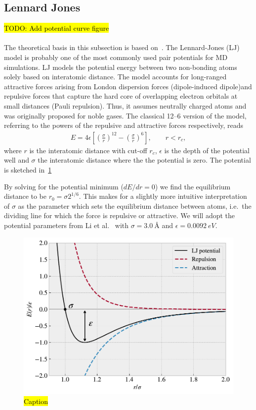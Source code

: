\subsection{Lennard Jones}\label{sec:LJ}
\hl{TODO: Add potential curve figure} 
\\
\\
The theoretical basis in this subsection is based on~\cite{docs_lammps_LJ,
C9CP05445F, chem_libretexts_LJ}. The Lennard-Jones (\acrshort{LJ}) model is probably one of the most commonly used pair potentials for \acrshort{MD} simulations. \acrshort{LJ} models the potential energy between two non-bonding atoms solely based on interatomic distance. The model accounts for long-ranged attractive forces arising from London dispersion forces (dipole-induced dipole)and repulsive forces that capture the hard core of overlapping electron orbitals at small distances (Pauli repulsion). Thus, it assumes neutrally charged atoms and was originally proposed for noble gases. The classical 12--6 version of the model, referring to the powers of the repulsive and attractive forces respectively, reads
\begin{align}
  E = 4\epsilon \left[\left(\frac{\sigma}{r}\right)^{12} - \left(\frac{\sigma}{r}\right)^6 \right ], \qquad r < r_c,
  \label{eq:LJ}
\end{align}
where $r$ is the interatomic distance with cut-off $r_c$, $\epsilon$ is the
depth of the potential well and $\sigma$ the interatomic distance where the
the potential is zero. The potential is sketched in~\cref{fig:LJ_pot}

By solving for the potential minimum ($dE/dr = 0$) we find the equilibrium distance to be $r_0 = \sigma 2^{1/6}$. This makes for a slightly more intuitive interpretation of $\sigma$ as the parameter which sets the equilibrium distance between atoms, i.e.\ the dividing line for which the force is repulsive or attractive. We will adopt the potential parameters from Li et al.~\cite{li_evolving_2016} with $\sigma = \SI{3.0}{\text{Å}}$ and $\epsilon = \SI{0.0092}{eV}$.

\begin{figure}[H]
  \centering
  \includegraphics[width=0.6\linewidth]{figures/theory/LJ_pot.pdf}
  \caption{\hl{Caption}}
  \label{fig:LJ_pot}
\end{figure}


